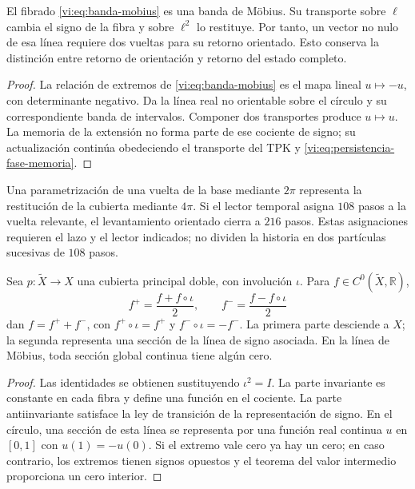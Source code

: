 \begin{theorem}
\label{vi:thm:retorno-mobius}
El fibrado \eqref{vi:eq:banda-mobius} es una banda de Möbius.
Su transporte sobre $\ell$ cambia el signo de la fibra y sobre
$\ell^2$ lo restituye. Por tanto, un vector no nulo de esa línea
requiere dos vueltas para su retorno orientado. Esto conserva la
distinción entre retorno de orientación y retorno del estado completo.
\end{theorem}
\begin{proof}
La relación de extremos de \eqref{vi:eq:banda-mobius} es el mapa
lineal $u\mapsto-u$, con determinante negativo. Da la línea real
no orientable sobre el círculo y su correspondiente banda de
intervalos. Componer dos transportes produce $u\mapsto u$.
La memoria de la extensión no forma parte de ese cociente de signo;
su actualización continúa obedeciendo el transporte del TPK y
\eqref{vi:eq:persistencia-fase-memoria}.
\end{proof}

Una parametrización de una vuelta de la base mediante $2\pi$
representa la restitución de la cubierta mediante $4\pi$. Si el
lector temporal asigna $108$ pasos a la vuelta relevante, el
levantamiento orientado cierra a $216$ pasos. Estas asignaciones
requieren el lazo y el lector indicados; no dividen la historia en
dos partículas sucesivas de $108$ pasos.

\begin{proposition}
\label{vi:prop:observables-paridad}
Sea $p:\widetilde X\to X$ una cubierta principal doble, con
involución $\iota$. Para $f\in C^0(\widetilde X,\mathbb R)$,
\[
 f^+=\frac{f+f\circ\iota}{2},\qquad
 f^-=\frac{f-f\circ\iota}{2}
\]
dan $f=f^++f^-$, con $f^+\circ\iota=f^+$ y
$f^-\circ\iota=-f^-$. La primera parte desciende a $X$; la
segunda representa una sección de la línea de signo asociada. En
la línea de Möbius, toda sección global continua tiene algún cero.
\end{proposition}
\begin{proof}
Las identidades se obtienen sustituyendo $\iota^2=I$. La parte
invariante es constante en cada fibra y define una función en el
cociente. La parte antiinvariante satisface la ley de transición
de la representación de signo. En el círculo, una sección de esta
línea se representa por una función real continua $u$ en $[0,1]$
con $u(1)=-u(0)$. Si el extremo vale cero ya hay un cero; en caso
contrario, los extremos tienen signos opuestos y el teorema del
valor intermedio proporciona un cero interior.
\end{proof}

